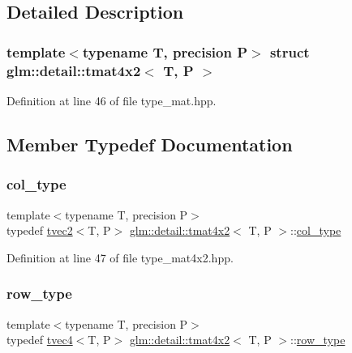 \subsection{Detailed Description}
\subsubsection*{template$<$typename T, precision P$>$\newline
struct glm\+::detail\+::tmat4x2$<$ T, P $>$}



Definition at line 46 of file type\+\_\+mat.\+hpp.



\subsection{Member Typedef Documentation}
\mbox{\label{structglm_1_1detail_1_1tmat4x2_a7ff0997d9fa4f93eba8a6530ca2cd3f7}} 
\subsubsection{\texorpdfstring{col\+\_\+type}{col\_type}}
{\footnotesize\ttfamily template$<$typename T, precision P$>$ \\
typedef \hyperlink{structglm_1_1detail_1_1tvec2}{tvec2}$<$T, P$>$ \hyperlink{structglm_1_1detail_1_1tmat4x2}{glm\+::detail\+::tmat4x2}$<$ T, P $>$\+::\hyperlink{structglm_1_1detail_1_1tmat4x2_a7ff0997d9fa4f93eba8a6530ca2cd3f7}{col\+\_\+type}}



Definition at line 47 of file type\+\_\+mat4x2.\+hpp.

\mbox{\label{structglm_1_1detail_1_1tmat4x2_a7800d3c9fae6e2e47ba71cac323aafcf}} 
\subsubsection{\texorpdfstring{row\+\_\+type}{row\_type}}
{\footnotesize\ttfamily template$<$typename T, precision P$>$ \\
typedef \hyperlink{structglm_1_1detail_1_1tvec4}{tvec4}$<$T, P$>$ \hyperlink{structglm_1_1detail_1_1tmat4x2}{glm\+::detail\+::tmat4x2}$<$ T, P $>$\+::\hyperlink{structglm_1_1detail_1_1tmat4x2_a7800d3c9fae6e2e47ba71cac323aafcf}{row\+\_\+type}}




